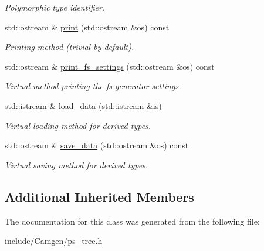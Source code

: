 \begin{DoxyCompactItemize}
\begin{DoxyCompactList}\small\item\em Polymorphic type identifier. \end{DoxyCompactList}\item 
\hypertarget{a00447_aa8997d96d03bd047551a20aee60ece34}{std\-::ostream \& \hyperlink{a00447_aa8997d96d03bd047551a20aee60ece34}{print} (std\-::ostream \&os) const }\label{a00447_aa8997d96d03bd047551a20aee60ece34}

\begin{DoxyCompactList}\small\item\em Printing method (trivial by default). \end{DoxyCompactList}\item 
\hypertarget{a00447_a969397598085e05b2b276221f02623b3}{std\-::ostream \& \hyperlink{a00447_a969397598085e05b2b276221f02623b3}{print\-\_\-fs\-\_\-settings} (std\-::ostream \&os) const }\label{a00447_a969397598085e05b2b276221f02623b3}

\begin{DoxyCompactList}\small\item\em Virtual method printing the fs-\/generator settings. \end{DoxyCompactList}\item 
\hypertarget{a00447_a1ca5db4566cf09d09058d7eece51d3ee}{std\-::istream \& \hyperlink{a00447_a1ca5db4566cf09d09058d7eece51d3ee}{load\-\_\-data} (std\-::istream \&is)}\label{a00447_a1ca5db4566cf09d09058d7eece51d3ee}

\begin{DoxyCompactList}\small\item\em Virtual loading method for derived types. \end{DoxyCompactList}\item 
\hypertarget{a00447_a0070c5ed59636469596bb3ed1fdc026d}{std\-::ostream \& \hyperlink{a00447_a0070c5ed59636469596bb3ed1fdc026d}{save\-\_\-data} (std\-::ostream \&os) const }\label{a00447_a0070c5ed59636469596bb3ed1fdc026d}

\begin{DoxyCompactList}\small\item\em Virtual saving method for derived types. \end{DoxyCompactList}\end{DoxyCompactItemize}
\subsection*{Additional Inherited Members}


The documentation for this class was generated from the following file\-:\begin{DoxyCompactItemize}
\item 
include/\-Camgen/\hyperlink{a00718}{ps\-\_\-tree.\-h}\end{DoxyCompactItemize}
